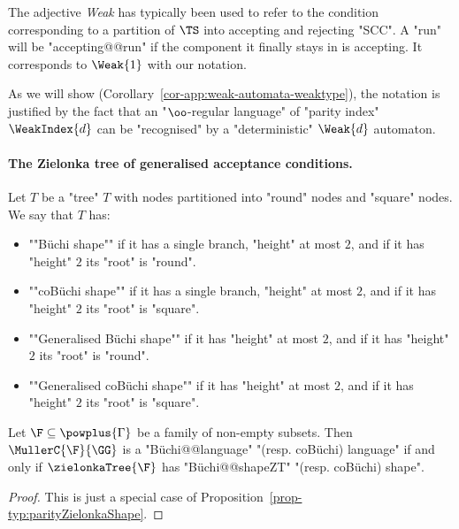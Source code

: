 \documentclass{theoretics}
\begin{document}
The adjective \textit{Weak} has typically been used to refer to the condition corresponding to a partition of $\TS$ into accepting and rejecting "SCC". A "run" will be "accepting@@run" if the component it finally stays in is accepting. It corresponds to $\Weak{1}$ with our notation.

As we will show (Corollary~\ref{cor-app:weak-automata-weaktype}), the notation is justified by the fact that an "$\oo$-regular language" of "parity index" $\WeakIndex{d}$ can be "recognised" by a "deterministic" $\Weak{d}$ automaton.



\paragraph*{The Zielonka tree of generalised acceptance conditions.}
\begin{definition}
	Let $T$ be a "tree" $T$ with nodes partitioned into "round" nodes and "square" nodes. We say that $T$ has:
	\begin{itemize}
		\item ""B\"uchi shape"" if it has a single branch, "height" at most $2$, and if it has "height" $2$ its "root" is "round".
		\item ""coB\"uchi shape"" if it has a single branch, "height" at most $2$, and if it has "height" $2$ its "root" is "square".
		
		\item  \AP""Generalised B\"uchi shape"" if it has "height" at most $2$, and if it has "height" $2$ its "root" is "round".
		
		\item  \AP""Generalised coB\"uchi shape"" if it has "height" at most $2$, and if it has "height" $2$ its "root" is "square".
	\end{itemize}
\end{definition}


\begin{proposition}
	Let $\F\subseteq \powplus{\Gamma}$ be a family of non-empty subsets. Then $\MullerC{\F}{\GG}$ is a "B\"uchi@@language" "(resp. coB\"uchi) language" if and only if $\zielonkaTree{\F}$ has "B\"uchi@@shapeZT" "(resp. coB\"uchi) shape".
\end{proposition}
\begin{proof}
	This is just a special case of Proposition~\ref{prop-typ:parityZielonkaShape}.
\end{proof}
\end{document}
